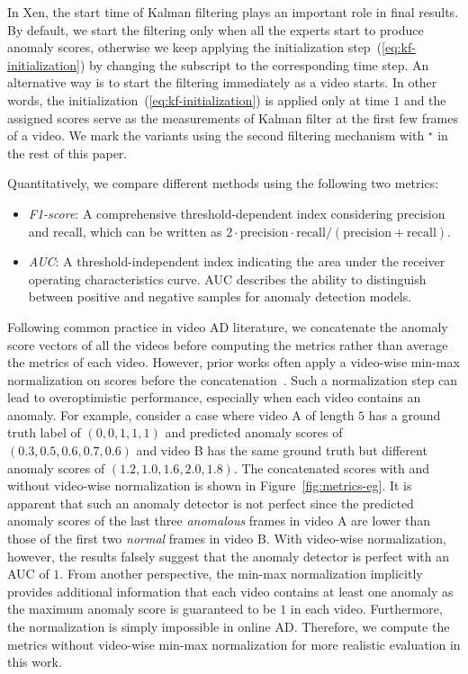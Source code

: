 In Xen, the start time of Kalman filtering plays an important role in final results. By default, we start the filtering only when all the experts start to produce anomaly scores, otherwise we keep applying the initialization step~(\ref{eq:kf-initialization}) by changing the subscript to the corresponding time step. An alternative way is to start the filtering immediately as a video starts. In other words, the initialization~(\ref{eq:kf-initialization}) is applied only at time $1$ and the assigned scores serve as the measurements of Kalman filter at the first few frames of a video. We mark the variants using the second filtering mechanism with $^\star$ in the rest of this paper.

Quantitatively, we compare different methods using the following two metrics:
\begin{itemize}
\item
\textit{F1-score}: A comprehensive threshold-dependent index considering precision and recall, which can be written as $2 \cdot \text{precision} \cdot \text{recall} / (\text{precision} + \text{recall})$.
\item
\textit{AUC}: A threshold-independent index indicating the area under the receiver operating characteristics curve. AUC describes the ability to distinguish between positive and negative samples for anomaly detection models.
\end{itemize}

Following common practice in video AD literature, we concatenate the anomaly score vectors of all the videos before computing the metrics rather than average the metrics of each video. However, prior works often apply a video-wise min-max normalization on scores before the concatenation~\citep{hasan2016learning,liu2018future,liu2021hybrid,yao2022dota}. Such a normalization step can lead to overoptimistic performance, especially when each video contains an anomaly. For example, consider a case where video A of length $5$ has a ground truth label of $(0, 0, 1, 1, 1)$ and predicted anomaly scores of $(0.3, 0.5, 0.6, 0.7, 0.6)$ and video B has the same ground truth but different anomaly scores of $(1.2, 1.0, 1.6, 2.0, 1.8)$. The concatenated scores with and without video-wise normalization is shown in Figure~\ref{fig:metrics-eg}. It is apparent that such an anomaly detector is not perfect since the predicted anomaly scores of the last three \textit{anomalous} frames in video A are lower than those of the first two \textit{normal} frames in video B. With video-wise normalization, however, the results falsely suggest that the anomaly detector is perfect with an AUC of $1$. From another perspective, the min-max normalization implicitly provides additional information that each video contains at least one anomaly as the maximum anomaly score is guaranteed to be $1$ in each video. Furthermore, the normalization is simply impossible in online AD. Therefore, we compute the metrics without video-wise min-max normalization for more realistic evaluation in this work.

